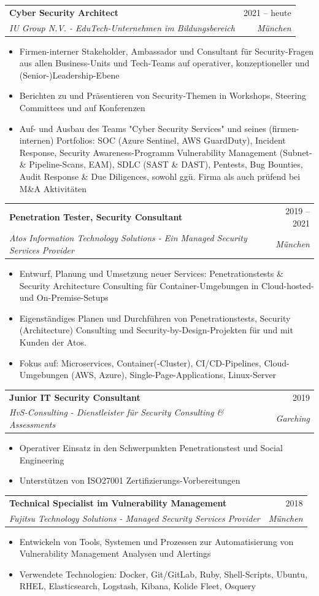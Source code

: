 \documentclass[letterpaper,11pt]{article}
\makeatletter
\newcommand{\resumeItemWithoutHeadline}[1]{
	\item\small{
		{#1 \vspace{-2pt}}
	}
}
\newcommand{\resumeSubheading}[4]{
  \vspace{-1pt}\item
    \begin{tabular*}{0.97\textwidth}[t]{l@{\extracolsep{\fill}}r}
      \textbf{#1} & #2 \\
      \textit{\small#3} & \textit{\small #4} \\
    \end{tabular*}\vspace{-5pt}
}
\newcommand{\resumeItemListStart}{\begin{itemize}}
\newcommand{\resumeItemListEnd}{\end{itemize}\vspace{-5pt}}
\makeatother
\begin{document}
	\resumeSubheading
	{Cyber Security Architect}{2021 -- heute}
  	{IU Group N.V. - EduTech-Unternehmen im Bildungsbereich}{München}
    \resumeItemListStart
    	\resumeItemWithoutHeadline
    	{Firmen-interner Stakeholder, Ambassador und Consultant für Security-Fragen \linebreak 
    	aus allen Business-Units und Tech-Teams auf operativer, konzeptioneller und (Senior-)Leadership-Ebene}
		\resumeItemWithoutHeadline
    	{Berichten zu und Präsentieren von Security-Themen in Workshops, Steering Committees und auf Konferenzen}
		\resumeItemWithoutHeadline
    	{Auf- und Ausbau des Teams "Cyber Security Services"  und seines (firmen-internen) Portfolios: \linebreak 
    	SOC (Azure Sentinel, AWS GuardDuty), Incident Response, Security Awareness-Programm \linebreak 
    	Vulnerability Management (Subnet- \& Pipeline-Scans, EAM), SDLC (SAST \& DAST), Pentests, Bug Bounties, \linebreak 
    	Audit Response \& Due Diligences, sowohl ggü. Firma als auch prüfend bei M\&A Aktivitäten}
	\resumeItemListEnd
 	
	\resumeSubheading
	{Penetration Tester, Security Consultant}{2019 -- 2021}
  	{Atos Information Technology Solutions - Ein Managed Security Services Provider}{München}
  	\resumeItemListStart
		\resumeItemWithoutHeadline
       	{Entwurf, Planung und Umsetzung neuer Services: Penetrationstests \& Security Architecture Consulting \linebreak
       	für Container-Umgebungen in Cloud-hosted- und On-Premise-Setups}
		\resumeItemWithoutHeadline
        {Eigenständiges Planen und Durchführen von Penetrationstests, Security (Architecture) Consulting und Security-by-Design-Projekten für und mit Kunden der Atos.}
		\resumeItemWithoutHeadline
		{Fokus auf: Microservices, Container(-Cluster), CI/CD-Pipelines, Cloud-Umgebungen (AWS, Azure), Single-Page-Applications, Linux-Server}
	\resumeItemListEnd
	
	\resumeSubheading
	{Junior IT Security Consultant}{2019}
  	{HvS-Consulting - Dienstleister für Security Consulting \& Assessments}{Garching}
  	\resumeItemListStart
		\resumeItemWithoutHeadline
       	{Operativer Einsatz in den Schwerpunkten Penetrationstest und Social Engineering}
       	\resumeItemWithoutHeadline
       	{Unterstützen von ISO27001 Zertifizierungs-Vorbereitungen}
	\resumeItemListEnd
	
	\resumeSubheading
	{Technical Specialist im Vulnerability Management}{2018}
	{Fujitsu Technology Solutions - Managed Security Services Provider}{München}
	\resumeItemListStart
		\resumeItemWithoutHeadline
		{Entwickeln von Tools, Systemen und Prozessen zur Automatisierung \linebreak
		von Vulnerability Management Analysen und Alertings}
		\resumeItemWithoutHeadline
		{Verwendete Technologien: Docker, Git/GitLab, Ruby, Shell-Scripts, Ubuntu, RHEL, \linebreak
		Elasticsearch, Logstash, Kibana, Kolide Fleet, Osquery}
	\resumeItemListEnd
	
\end{document}
